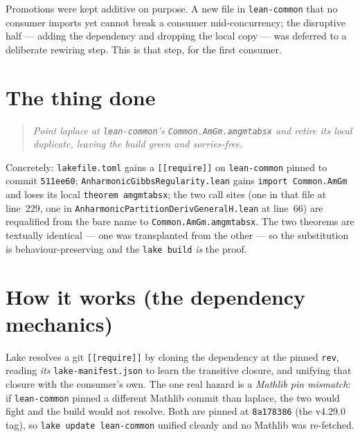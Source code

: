 \documentclass[11pt]{article}
\renewcommand{\_}{\textunderscore\allowbreak}
\begin{document}
Promotions were kept additive on purpose. A new file in \texttt{lean-common}
that no consumer imports yet cannot break a consumer mid-concurrency; the
disruptive half --- adding the dependency and dropping the local copy --- was
deferred to a deliberate rewiring step. This is that step, for the first
consumer.

\section{The thing done}

\begin{quote}\itshape
Point laplace at \texttt{lean-common}'s \texttt{Common.AmGm.amgm\_t\_abs\_x} and
retire its local duplicate, leaving the build green and sorries-free.
\end{quote}

Concretely: \texttt{lakefile.toml} gains a \texttt{[[require]]} on
\texttt{lean-common} pinned to commit \texttt{511ee60};
\texttt{AnharmonicGibbsRegularity.lean} gains \texttt{import Common.AmGm} and
loses its local \texttt{theorem amgm\_t\_abs\_x}; the two call sites (one in that
file at line~229, one in \texttt{AnharmonicPartitionDerivGeneralH.lean} at
line~66) are requalified from the bare name to
\texttt{Common.AmGm.amgm\_t\_abs\_x}. The two theorems are textually identical
--- one was transplanted from the other --- so the substitution is
behaviour-preserving and the \texttt{lake build} \emph{is} the proof.

\section{How it works (the dependency mechanics)}

Lake resolves a git \texttt{[[require]]} by cloning the dependency at the pinned
\texttt{rev}, reading \emph{its} \texttt{lake-manifest.json} to learn the
transitive closure, and unifying that closure with the consumer's own. The one
real hazard is a \emph{Mathlib pin mismatch}: if \texttt{lean-common} pinned a
different Mathlib commit than laplace, the two would fight and the build would
not resolve. Both are pinned at \texttt{8a178386} (the v4.29.0 tag), so
\texttt{lake update lean-common} unified cleanly and no Mathlib was re-fetched.
\end{document}
